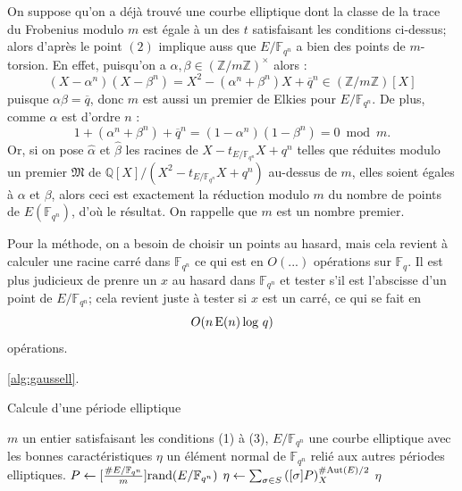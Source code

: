 \documentclass[a4paper]{article} %
\numberwithin{section}{part}
\numberwithin{equation}{section}
\newcommand\zmodn[1]{\mathbb{Z}/#1\mathbb{Z}}
\newcommand\zmodninv[1]{(\mathbb{Z}/#1\mathbb{Z})^{\times}}
\newcommand\GF[1]{\mathbb{F}_{#1}}
\newcommand\QQ{\mathbb{Q}}
\newcommand\EO{\mathcal{O}}
\newcommand\E[1]{\textup{E}(#1)}
\begin{document}
\begin{rem}
On suppose qu'on a déjà trouvé une courbe elliptique dont la classe de la trace
du Frobenius modulo $m$ est égale à un des $t$ satisfaisant les conditions
ci-dessus; alors d'après le point $(2)$ implique auss que $E/\GF{q^n}$ a bien 
des points de $m$-torsion. En effet, puisqu'on a $\alpha,\beta\in\zmodninv{m}$ 
alors :
\begin{equation}
(X - \alpha^n)(X - \beta^n) = X^2 - (\alpha^n + \beta^n)X +
\overline{q}^n\in(\zmodn{m})[X]
\end{equation}
puisque $\alpha\beta = \overline{q}$, donc $m$ est aussi un premier de Elkies
pour $E/\GF{q^n}$. De plus, comme $\alpha$ est d'ordre $n$ :
\begin{equation}
1 + (\alpha^n + \beta^n) + \overline{q}^n = (1 - \alpha^n)(1 - \beta^n) =
0\bmod{m}.
\end{equation}
Or, si on pose $\hat{\alpha}$ et $\hat{\beta}$ les racines de $X -
t_{E/\GF{q^n}}X + q^n$ telles que réduites modulo un premier $\mathfrak{M}$ de
$\QQ[X]/(X^2 - t_{E/\GF{q^n}}X + q^n)$ au-dessus de $m$, elles soient égales à 
$\alpha$ et $\beta$, alors ceci est exactement la réduction modulo $m$ du nombre
de points de $E(\GF{q^n})$, d'où le résultat. On rappelle que $m$ est un nombre
premier.
\end{rem}
Pour la méthode, on a besoin de choisir un points au hasard, mais cela revient à
calculer une racine carré dans $\GF{q^n}$ ce qui est en $O(...)$ opérations sur
$\GF{q}$. Il est plus judicieux de prenre un $x$ au hasard dans $\GF{q^n}$ et
tester s'il est l'abscisse d'un point de $E/\GF{q^n}$; cela revient juste à
tester si $x$ est un carré, ce qui se fait en 
\begin{equation}
O(n\,\E{n}\,\textup{log }q)
\end{equation}
opérations.


\ref{alg:gaussell}.
\begin{algorithm}
\caption{Calcule d'une période elliptique}
\label{alg:gaussell}
\begin{algorithmic}[1]
\REQUIRE $m$ un entier satisfaisant les conditions (1) à (3), $E/\GF{q^n}$ une 
courbe elliptique avec les bonnes caractéristiques
\ENSURE $\eta$ un élément normal de $\GF{q^n}$ relié aux autres périodes
elliptiques.
\bigskip
\REPEAT
    \STATE $P \leftarrow [\frac{\#E/\GF{q^n}}{m}]\textup{rand}(E/\GF{q^n})$
\UNTIL{$[m]P = \EO\quad\&\quad\forall d\mid m, d\neq m, [d]P\neq\EO$}
\STATE $\eta \leftarrow \sum_{\sigma\in
S}{\left([\sigma]P\right)_X^{\#\textup{Aut}(E)/2}}$
\RETURN $\eta$
\end{algorithmic}
\end{algorithm}
\end{document}
